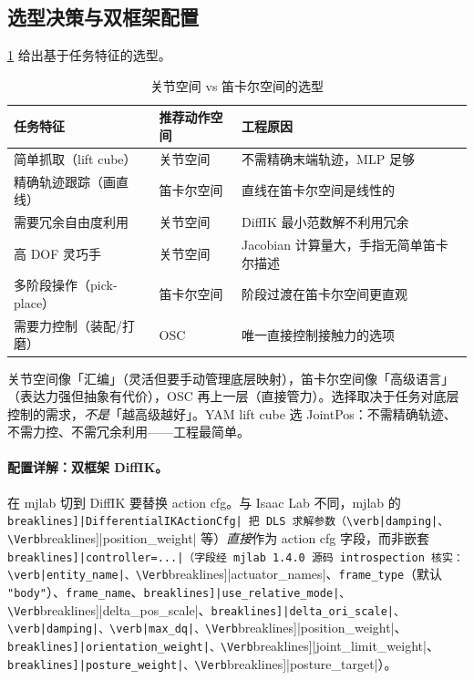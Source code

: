 
\subsection{选型决策与双框架配置}
\label{sec:rlmc-manip-actionchoose}

\cref{tab:rlmc-manip-actionchoose} 给出基于任务特征的选型。

\begin{table}[ht]
\centering
\small
\caption{关节空间 vs 笛卡尔空间的选型}
\label{tab:rlmc-manip-actionchoose}
\begin{tabular}{@{}lll@{}}
\toprule
任务特征 & 推荐动作空间 & 工程原因 \\
\midrule
简单抓取（lift cube） & 关节空间 & 不需精确末端轨迹，MLP 足够 \\
精确轨迹跟踪（画直线） & 笛卡尔空间 & 直线在笛卡尔空间是线性的 \\
需要冗余自由度利用 & 关节空间 & DiffIK 最小范数解不利用冗余 \\
高 DOF 灵巧手 & 关节空间 & Jacobian 计算量大，手指无简单笛卡尔描述 \\
多阶段操作（pick-place） & 笛卡尔空间 & 阶段过渡在笛卡尔空间更直观 \\
需要力控制（装配/打磨） & OSC & 唯一直接控制接触力的选项 \\
\bottomrule
\end{tabular}
\end{table}

\begin{insight}\label{ins:rlmc-manip-abstraction}
关节空间像「汇编」（灵活但要手动管理底层映射），笛卡尔空间像「高级语言」（表达力强但抽象有代价），OSC 再上一层（直接管力）。选择取决于任务对底层控制的需求，\emph{不是}「越高级越好」。YAM lift cube 选 JointPos：不需精确轨迹、不需力控、不需冗余利用——工程最简单。
\end{insight}

\paragraph{配置详解：双框架 DiffIK。}在 mjlab 切到 DiffIK 要替换 action cfg。与 Isaac Lab 不同，mjlab 的 \Verb[breaklines]|DifferentialIKActionCfg| 把 DLS 求解参数（\verb|damping|、\Verb[breaklines]|position_weight| 等）\emph{直接}作为 action cfg 字段，而非嵌套 \Verb[breaklines]|controller=...|（字段经 mjlab 1.4.0 源码 introspection 核实：\verb|entity_name|、\Verb[breaklines]|actuator_names|、\verb|frame_type|（默认 \texttt{"body"}）、\verb|frame_name|、\Verb[breaklines]|use_relative_mode|、\Verb[breaklines]|delta_pos_scale|、\Verb[breaklines]|delta_ori_scale|、\verb|damping|、\verb|max_dq|、\Verb[breaklines]|position_weight|、\Verb[breaklines]|orientation_weight|、\Verb[breaklines]|joint_limit_weight|、\Verb[breaklines]|posture_weight|、\Verb[breaklines]|posture_target|）。

